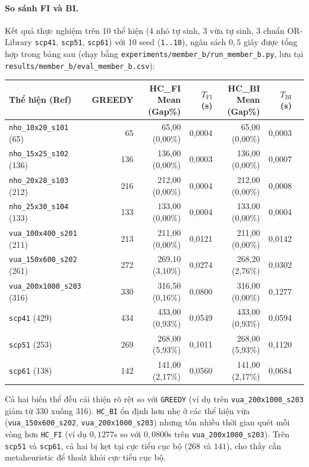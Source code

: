 \paragraph{So sánh FI và BI.} Kết quả thực nghiệm trên 10 thể hiện (4 nhỏ tự sinh, 3 vừa tự sinh, 3 chuẩn OR-Library \texttt{scp41}, \texttt{scp51}, \texttt{scp61}) với 10 seed (\texttt{1..10}), ngân sách $0{,}5$ giây được tổng hợp trong bảng sau (chạy bằng \texttt{experiments/member\_b/run\_member\_b.py}, lưu tại \texttt{results/member\_b/eval\_member\_b.csv}):
\begin{center}
\small
\begin{tabular}{lrrrrrr}
\toprule
Thể hiện (Ref) & GREEDY & HC\_FI Mean (Gap\%) & $T_{\mathrm{FI}}$ (s) & HC\_BI Mean (Gap\%) & $T_{\mathrm{BI}}$ (s) \\
\midrule
\texttt{nho\_10x20\_s101} (65)  & 65  & 65,00 (0,00\%)  & 0,0004 & 65,00 (0,00\%)  & 0,0003 \\
\texttt{nho\_15x25\_s102} (136) & 136 & 136,00 (0,00\%) & 0,0003 & 136,00 (0,00\%) & 0,0007 \\
\texttt{nho\_20x28\_s103} (212) & 216 & 212,00 (0,00\%) & 0,0004 & 212,00 (0,00\%) & 0,0008 \\
\texttt{nho\_25x30\_s104} (133) & 133 & 133,00 (0,00\%) & 0,0004 & 133,00 (0,00\%) & 0,0004 \\
\texttt{vua\_100x400\_s201} (211) & 213 & 211,00 (0,00\%) & 0,0121 & 211,00 (0,00\%) & 0,0142 \\
\texttt{vua\_150x600\_s202} (261) & 272 & 269,10 (3,10\%) & 0,0274 & 268,20 (2,76\%) & 0,0302 \\
\texttt{vua\_200x1000\_s203} (316) & 330 & 316,50 (0,16\%) & 0,0800 & 316,00 (0,00\%) & 0,1277 \\
\texttt{scp41} (429) & 434 & 433,00 (0,93\%) & 0,0549 & 433,00 (0,93\%) & 0,0594 \\
\texttt{scp51} (253) & 269 & 268,00 (5,93\%) & 0,1011 & 268,00 (5,93\%) & 0,1120 \\
\texttt{scp61} (138) & 142 & 141,00 (2,17\%) & 0,0560 & 141,00 (2,17\%) & 0,0684 \\
\bottomrule
\end{tabular}
\end{center}
Cả hai biến thể đều cải thiện rõ rệt so với \texttt{GREEDY} (ví dụ trên \texttt{vua\_200x1000\_s203} giảm từ 330 xuống 316). \texttt{HC\_BI} ổn định hơn nhẹ ở các thể hiện vừa (\texttt{vua\_150x600\_s202}, \texttt{vua\_200x1000\_s203}) nhưng tốn nhiều thời gian quét mỗi vòng hơn \texttt{HC\_FI} (ví dụ $0{,}1277$s so với $0{,}0800$s trên \texttt{vua\_200x1000\_s203}). Trên \texttt{scp51} và \texttt{scp61}, cả hai bị kẹt tại cực tiểu cục bộ ($268$ và $141$), cho thấy cần metaheuristic để thoát khỏi cực tiểu cục bộ.

